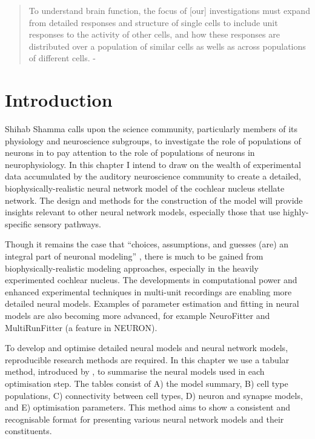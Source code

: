  

\begin{quotation}
  To understand brain function, the focus of [our] investigations must
  expand from detailed responses and structure of single cells to
  include unit responses to the activity of other cells, and how these
  responses are distributed over a population of similar cells as
  wells as across populations of different cells.  - \emph{\citet{Shamma:1998}}
\end{quotation}




\section{Introduction}

Shihab Shamma calls upon the science community, particularly members
of its physiology and neuroscience subgroups, to investigate the role
of populations of neurons in to pay attention to the role of
populations of neurons in neurophysiology. In this chapter I intend to
draw on the wealth of experimental data accumulated by the auditory
neuroscience community to create a detailed, biophysically-realistic
neural network model of the cochlear nucleus stellate network.  The
design and methods for the construction of the model will provide
insights relevant to other neural network models, especially those
that use highly-specific sensory pathways.

\medskip{}

Though it remains the case that ``choices, assumptions, and guesses
(are) an integral part of neuronal modeling''
\citep{SegevBurkeEtAl:1998}, there is much to be gained from
biophysically-realistic modeling approaches, especially in the heavily
experimented cochlear nucleus. The developments in computational power
and enhanced experimental techniques in multi-unit recordings are
enabling more detailed neural models. Examples of parameter estimation
and fitting in neural models are also becoming more advanced, for
example NeuroFitter \citep{VanAchardEtAl:2007} and MultiRunFitter (a feature in
NEURON).  



\medskip{}

  To develop
and optimise detailed neural models and neural network models, reproducible
research methods are required. In this chapter we use a tabular method,
introduced by \citet{NordlieGewaltigEtAl:2009}, to summarise the neural models
used in each optimisation step. The tables consist of A) the model summary, B)
cell type populations, C) connectivity between cell types, D) neuron and synapse
models, and E) optimisation parameters.  This method aims to show a consistent
and recognisable format for presenting various neural network models and their
constituents.

